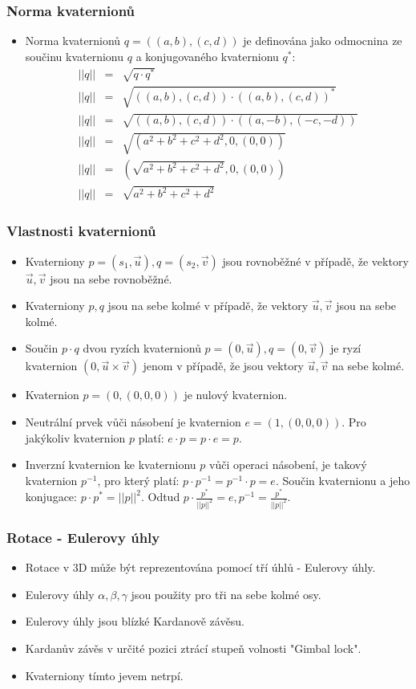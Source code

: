 \begin{frame}
\frametitle{Norma kvaternionů}
\begin{itemize}
\item Norma kvaternionů $q=((a,b),(c,d))$ je definována jako odmocnina ze součinu kvaternionu $q$ a konjugovaného kvaternionu $q^*$:
\begin{eqnarray*}
||q|| &=& \sqrt{q \cdot q^*}\\
||q|| &=& \sqrt{((a,b),(c,d)) \cdot ((a,b),(c,d))^*}\\
||q|| &=& \sqrt{((a,b),(c,d)) \cdot ((a,-b),(-c,-d))}\\
||q|| &=& \sqrt{(a^2+b^2+c^2+d^2,0,(0,0))}\\
||q|| &=& (\sqrt{a^2+b^2+c^2+d^2},0,(0,0))\\
||q|| &=& \sqrt{a^2+b^2+c^2+d^2}
\end{eqnarray*}

\end{itemize}
\end{frame}

\begin{frame}
\frametitle{Vlastnosti kvaternionů}
\begin{itemize}
\item
Kvaterniony $p=(s_1,\vec u),q=(s_2,\vec v)$ jsou rovnoběžné v případě, že vektory $\vec u,\vec v$ jsou na sebe rovnoběžné.
\item
Kvaterniony $p,q$ jsou na sebe kolmé v případě, že vektory $\vec u,\vec v$ jsou na sebe kolmé.
\item
Součin $p \cdot q$ dvou ryzích kvaternionů $p=(0,\vec u),q=(0,\vec v)$ je ryzí kvaternion $(0,\vec u \times \vec v)$ jenom v případě, že jsou vektory $\vec u,\vec v$ na sebe kolmé.
\item
Kvaternion $p=(0,(0,0,0))$ je nulový kvaternion.
\item
Neutrální prvek vůči násobení je kvaternion $e=(1,(0,0,0))$.
Pro jakýkoliv kvaternion $p$ platí: $e\cdot p=p \cdot e = p$.
\item
Inverzní kvaternion ke kvaternionu $p$ vůči operaci násobení, je takový kvaternion $p^{-1}$, pro který platí: $p\cdot p^{-1}=p^{-1}\cdot p=e$.
Součin kvaternionu a jeho konjugace: $p\cdot p^*=||p||^2$.
Odtud $p\cdot \frac{p^{*}}{||p||^2}=e,p^{-1}=\frac{p^*}{||p||^2}$.
\end{itemize}
\end{frame}

\begin{frame}
\frametitle{Rotace - Eulerovy úhly}
\begin{itemize}
\item Rotace v 3D může být reprezentována pomocí tří úhlů - Eulerovy úhly.
\item Eulerovy úhly $\alpha,\beta,\gamma$ jsou použity pro tři na sebe kolmé osy.
\item Eulerovy úhly jsou blízké Kardanově závěsu.
\item Kardanův závěs v určité pozici ztrácí stupeň volnosti "Gimbal lock".
\item Kvaterniony tímto jevem netrpí.
\end{itemize}
\end{frame}

